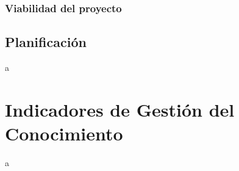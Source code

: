 \documentclass[a4paper]{article}
\begin{document}
\subsubsection{Viabilidad del proyecto}

\subsection{Planificación}

a

\section{Indicadores de Gestión del Conocimiento}

a
\end{document}

